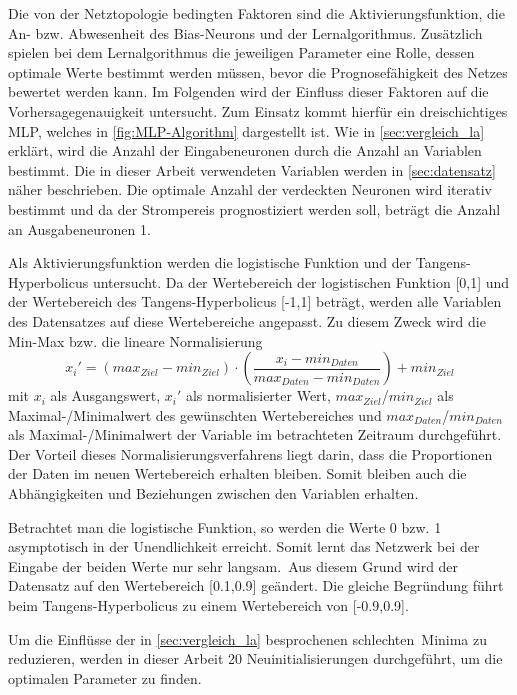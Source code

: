 Die von der Netztopologie bedingten Faktoren sind die Aktivierungsfunktion, die An- bzw. Abwesenheit des Bias-Neurons und der Lernalgorithmus. Zusätzlich spielen bei dem Lernalgorithmus die jeweiligen Parameter eine Rolle, dessen optimale Werte bestimmt werden müssen, bevor die Prognosefähigkeit des Netzes bewertet werden kann.
Im Folgenden wird der Einfluss dieser Faktoren auf die Vorhersagegenauigkeit untersucht. Zum Einsatz kommt hierfür ein dreischichtiges MLP, welches in \autoref{fig:MLP-Algorithm} dargestellt ist. Wie in \autoref{sec:vergleich_la} erklärt, wird die Anzahl der Eingabeneuronen durch die Anzahl an Variablen bestimmt. Die in dieser Arbeit verwendeten Variablen werden in \autoref{sec:datensatz} näher beschrieben. Die optimale Anzahl der verdeckten Neuronen wird iterativ bestimmt und da der Strompereis prognostiziert werden soll, beträgt die Anzahl an Ausgabeneuronen 1. 

Als Aktivierungsfunktion werden die logistische Funktion und der Tangens-Hyperbolicus untersucht. Da der Wertebereich der logistischen Funktion [0,1] und der Wertebereich des Tangens-Hyperbolicus [-1,1] beträgt, werden alle Variablen des Datensatzes auf diese Wertebereiche angepasst. Zu diesem Zweck wird die Min-Max bzw. die lineare Normalisierung
\begin{equation}
x_i'=(max_{Ziel} - min_{Ziel}) \cdot \left ( \frac{x_i-min_{Daten}}{max_{Daten}-min_{Daten}} \right ) + min_{Ziel}
\label{gl:norm}
\end{equation}
mit $x_i$ als Ausgangswert, $x_i'$ als normalisierter Wert, $max_{Ziel}$/$min_{Ziel}$ als Maximal-/Minimalwert des gewünschten Wertebereiches und $max_{Daten}$/$min_{Daten}$ als Maximal-/Minimalwert der Variable im betrachteten Zeitraum durchgeführt. Der Vorteil dieses Normalisierungsverfahrens liegt darin, dass die Proportionen der Daten im neuen Wertebereich erhalten bleiben. Somit bleiben auch die Abhängigkeiten und Beziehungen zwischen den Variablen erhalten.\, 

Betrachtet man die logistische Funktion, so werden die Werte 0 bzw. 1 asymptotisch in der Unendlichkeit erreicht. Somit lernt das Netzwerk bei der Eingabe der beiden Werte nur sehr langsam.\, Aus diesem Grund wird der Datensatz auf den Wertebereich [0.1,0.9] geändert. Die gleiche Begründung führt beim Tangens-Hyperbolicus zu einem Wertebereich von [-0.9,0.9].

Um die Einflüsse der in \autoref{sec:vergleich_la} besprochenen \glqq schlechten\grqq~Minima zu reduzieren, werden in dieser Arbeit 20 Neuinitialisierungen durchgeführt, um die optimalen Parameter zu finden.

